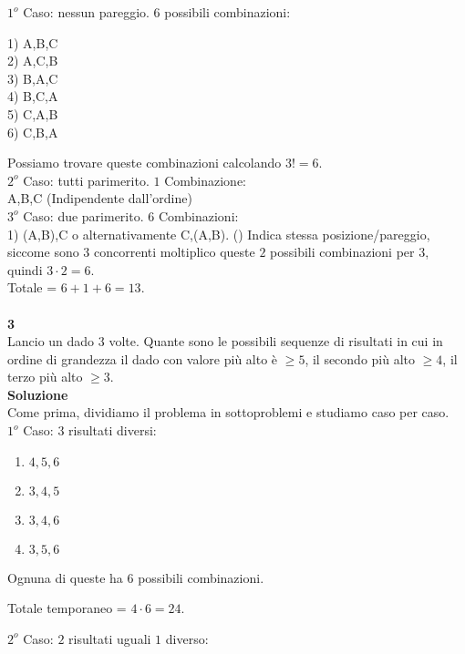 \documentclass[11pt]{article}
\begin{document}
            $1^o$ Caso: nessun pareggio. 6 possibili combinazioni:
            \begin{center}
            	1) A,B,C\\
            	2) A,C,B\\
            	3) B,A,C\\
            	4) B,C,A\\
            	5) C,A,B\\
            	6) C,B,A\\
            \end{center}
            Possiamo trovare queste combinazioni calcolando $3! = 6$.\\
            $2^o$ Caso: tutti parimerito. $1$ Combinazione:\\
            A,B,C (Indipendente dall'ordine)\\
            $3^o$ Caso: due parimerito. $6$ Combinazioni:\\
            1) (A,B),C o alternativamente C,(A,B). () Indica stessa posizione/pareggio, siccome sono $3$ concorrenti moltiplico queste $2$ possibili combinazioni per $3$, quindi $3 \cdot 2 = 6$.\\
            Totale = $6 + 1 + 6 = 13$.\\
            \\
            \textbf{\large 3}\\
            Lancio un dado $3$ volte. Quante sono le possibili sequenze di risultati in cui in ordine di grandezza il dado con valore più alto è $\geq 5$, il secondo più alto $\geq 4$, il terzo più alto $\geq 3$.\\
            \textbf{\large Soluzione}\\
            Come prima, dividiamo il problema in sottoproblemi e studiamo caso per caso.\\
            $1^o$ Caso: $3$ risultati diversi:
			\begin{enumerate}
				\item $4, 5, 6$
				\item $3, 4, 5$
				\item $3, 4, 6$
				\item $3, 5, 6$

			\end{enumerate}
            Ognuna di queste ha 6 possibili combinazioni.

            Totale temporaneo = $4 \cdot 6 = 24$.

            $2^o$ Caso: $2$ risultati uguali $1$ diverso:
\end{document}
